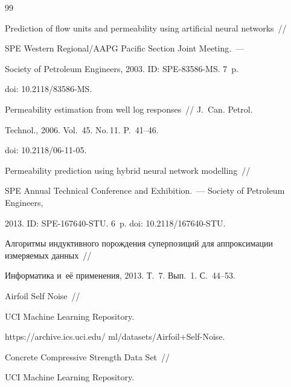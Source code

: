 {{\begin{thebibliography}{99}
    



Prediction of flow units and permeability using artificial neural networks~/\!\!/ 

SPE Western Regional/AAPG Pacific Section Joint Meeting.~--- 

Society of Petroleum Engineers, 2003.  ID: SPE-83586-MS. 7~p.

doi: 10.2118/83586-MS.





Permeability estimation from well log responses~/\!\!/ J.~Can. Petrol. 

Technol., 2006. Vol.~45. No.\,11. P.~41--46.

doi: 10.2118/06-11-05.

    



 Permeability prediction using hybrid neural network modelling~/\!\!/ 

 SPE Annual Technical Conference and Exhibition.~--- Society of Petroleum Engineers, 

 2013. ID: SPE-167640-STU. 6~p. doi: 10.2118/167640-STU.

    



Алгоритмы индуктивного порождения суперпозиций для аппроксимации измеряемых данных~/\!\!/ 

Информатика и~её применения, 2013. Т.~7. Вып.~1. С.~44--53.

    


    Airfoil Self Noise~/\!\!/

    UCI Machine Learning Repository. 

    {\sf https://archive.ics.uci.edu/ ml/datasets/Airfoil+Self-Noise}.

    


    Concrete Compressive Strength Data Set~/\!\!/

 UCI Machine Learning Repository. 


\end{thebibliography}}}
